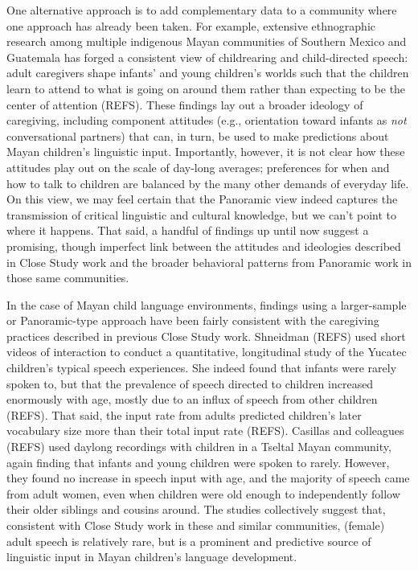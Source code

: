 \documentclass[,man,floatsintext]{apa6}
\begin{document}
One alternative approach is to add complementary data to a community
where one approach has already been taken. For example, extensive
ethnographic research among multiple indigenous Mayan communities of
Southern Mexico and Guatemala has forged a consistent view of
childrearing and child-directed speech: adult caregivers shape infants'
and young children's worlds such that the children learn to attend to
what is going on around them rather than expecting to be the center of
attention (REFS). These findings lay out a broader ideology of
caregiving, including component attitudes (e.g., orientation toward
infants as \emph{not} conversational partners) that can, in turn, be
used to make predictions about Mayan children's linguistic input.
Importantly, however, it is not clear how these attitudes play out on
the scale of day-long averages; preferences for when and how to talk to
children are balanced by the many other demands of everyday life. On
this view, we may feel certain that the Panoramic view indeed captures
the transmission of critical linguistic and cultural knowledge, but we
can't point to where it happens. That said, a handful of findings up
until now suggest a promising, though imperfect link between the
attitudes and ideologies described in Close Study work and the broader
behavioral patterns from Panoramic work in those same communities.

In the case of Mayan child language environments, findings using a
larger-sample or Panoramic-type approach have been fairly consistent
with the caregiving practices described in previous Close Study work.
Shneidman (REFS) used short videos of interaction to conduct a
quantitative, longitudinal study of the Yucatec children's typical
speech experiences. She indeed found that infants were rarely spoken to,
but that the prevalence of speech directed to children increased
enormously with age, mostly due to an influx of speech from other
children (REFS). That said, the input rate from adults predicted
children's later vocabulary size more than their total input rate
(REFS). Casillas and colleagues (REFS) used daylong recordings with
children in a Tseltal Mayan community, again finding that infants and
young children were spoken to rarely. However, they found no increase in
speech input with age, and the majority of speech came from adult women,
even when children were old enough to independently follow their older
siblings and cousins around. The studies collectively suggest that,
consistent with Close Study work in these and similar communities,
(female) adult speech is relatively rare, but is a prominent and
predictive source of linguistic input in Mayan children's language
development.
\end{document}
